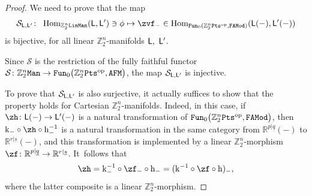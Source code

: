 \documentclass[10pt,a4paper]{amsart}
\newcommand{\op}[1]{\operatorname{#1}}
\newcommand{\R}{{\mathbb R}}
\newcommand{\Z}{{\mathbb Z}}
\def\ul{\underline}
\def\ul{\underline}
\newcommand{\0}{\otimes}
\newcommand{\z}{\Z_2^n}
\numberwithin{equation}{section}
\begin{document}
\begin{proof} We need to prove that the map
\[
\mathcal{S}_{\sf L,L'}\colon\ \op{Hom}_{\z\tt LinMan}({\sf L,L'})\ni\phi\mapsto \zvf_-\in\op{Hom}_{{\tt Fun}_0(\z{\tt Pts}^{\op{op}},\tt FAMod)}({\sf L}(-),{\sf L'}(-))
\]
is bijective, for all linear $\z$-manifolds $\sf L,\ L'$.

Since $\mathcal{S}$ is the restriction of the fully faithful functor $\mathcal{S}\colon {\z\tt Man}\to{\tt Fun}_0\big(\z{\tt Pts}^{\op{op}},{\tt AFM}\big)$, the map $\mathcal{S}_{\sf L,L'}$ is injective.

To prove that $\mathcal{S}_{\sf L,L'}$ is also surjective, it actually suffices to show that the property holds for Cartesian $\z$-manifolds. Indeed, in this case, if $\zh\colon {\sf L}(-)\to{\sf L}'(-)$ is a natural transformation of ${\tt Fun}_0\big(\z{\tt Pts}^{\op{op}},\tt FAMod\big)$, then $ {\rm k}_-\circ \zh\circ{\rm h}^{-1}_-$ is a natural transformation in the same category from $\R^{p|\ul q}(-)$ to $\R^{r|\ul s}(-)$, and this transformation is implemented by a linear $\z$-morphism $\zf\colon \R^{p|\ul q}\to \R^{r|\ul s}$. It~follows that
\[
\zh={\rm k}_-^{-1}\circ\zf_-\circ{\rm h}_-=({\rm k}^{-1}\circ\zf\circ{\rm h})_-,
\]
where the latter composite is a linear $\z$-morphism.


\end{proof}
\end{document}
